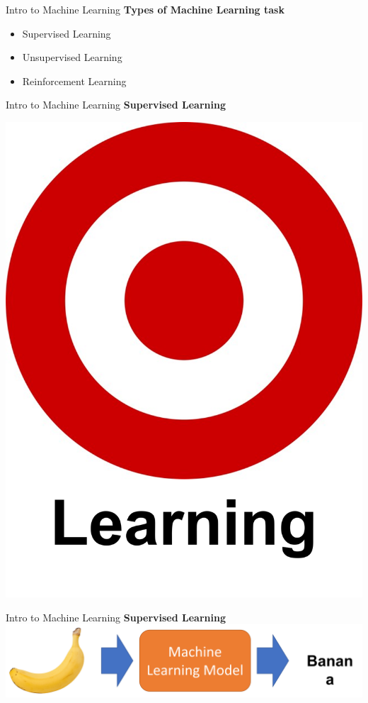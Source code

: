 \documentclass{beamer}
\begin{document}
\begin{frame}[fragile]{Intro to Machine Learning}
    \textbf{Types of Machine Learning task}
    \begin{itemize}
        \item Supervised Learning
        \item Unsupervised Learning
        \item Reinforcement Learning
    \end{itemize}
\end{frame}

\begin{frame}[fragile]{Intro to Machine Learning}
    \textbf{Supervised Learning}
    \begin{center}
        \includegraphics[width=\textwidth,height=0.7\textheight,keepaspectratio]{figures/Target.png}
    \end{center}
\end{frame}
\begin{frame}[fragile]{Intro to Machine Learning}
    \textbf{Supervised Learning}
    \includegraphics[width=\textwidth,height=\textheight,keepaspectratio]{figures/Supervised_example_1.png}
\end{frame}
\end{document}
